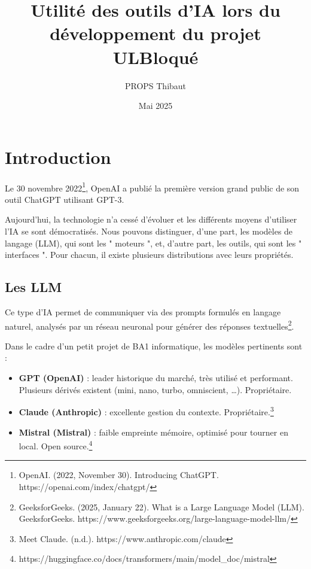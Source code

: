 \documentclass[utf8]{article}
\title{Utilité des outils d'IA lors du développement du projet ULBloqué}
\author{PROPS Thibaut}
\date{Mai 2025}
\begin{document}
\maketitle
\tableofcontents

\newpage


\section{Introduction}
Le 30 novembre 2022\footnote{OpenAI. (2022, November 30). Introducing ChatGPT. https://openai.com/index/chatgpt/}, OpenAI a publié la première version grand public de son outil ChatGPT utilisant GPT-3.

Aujourd'hui, la technologie n'a cessé d'évoluer et les différents moyens d'utiliser l'IA se sont démocratisés. Nous pouvons distinguer, d'une part, les modèles de langage (LLM), qui sont les " moteurs ", et, d'autre part, les outils, qui sont les " interfaces ". Pour chacun, il existe plusieurs distributions avec leurs propriétés.

\subsection{Les LLM}
Ce type d'IA permet de communiquer via des prompts formulés en langage naturel, analysés par un réseau neuronal pour générer des réponses textuelles\footnote{GeeksforGeeks. (2025, January 22). What is a Large Language Model (LLM). GeeksforGeeks. https://www.geeksforgeeks.org/large-language-model-llm/}.

Dans le cadre d'un petit projet de BA1 informatique, les modèles pertinents sont :

\begin{itemize}
  \item \textbf{GPT (OpenAI)} :  
    leader historique du marché, très utilisé et performant.  
    Plusieurs dérivés existent (mini, nano, turbo, omniscient, …).  
    Propriétaire.
  \item \textbf{Claude (Anthropic)} :  
    excellente gestion du contexte.  
    Propriétaire.\footnote{Meet Claude. (n.d.). https://www.anthropic.com/claude}
  \item \textbf{Mistral (Mistral)} :  
    faible empreinte mémoire, optimisé pour tourner en local.  
    Open source.\footnote{https://huggingface.co/docs/transformers/main/model_doc/mistral}
\end{itemize}
\end{document}
